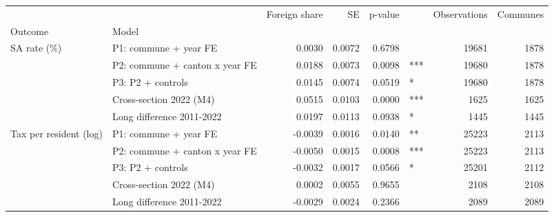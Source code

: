 \begin{tabular}{llrrrlrr}
\toprule
 &  & Foreign share & SE & p-value &  & Observations & Communes \\
Outcome & Model &  &  &  &  &  &  \\
\midrule
\multirow[t]{5}{*}{SA rate (\%)} & P1: commune + year FE & 0.0030 & 0.0072 & 0.6798 &  & 19681 & 1878 \\
 & P2: commune + canton x year FE & 0.0188 & 0.0073 & 0.0098 & *** & 19680 & 1878 \\
 & P3: P2 + controls & 0.0145 & 0.0074 & 0.0519 & * & 19680 & 1878 \\
 & Cross-section 2022 (M4) & 0.0515 & 0.0103 & 0.0000 & *** & 1625 & 1625 \\
 & Long difference 2011-2022 & 0.0197 & 0.0113 & 0.0938 & * & 1445 & 1445 \\
\cline{1-8}
\multirow[t]{5}{*}{Tax per resident (log)} & P1: commune + year FE & -0.0039 & 0.0016 & 0.0140 & ** & 25223 & 2113 \\
 & P2: commune + canton x year FE & -0.0050 & 0.0015 & 0.0008 & *** & 25223 & 2113 \\
 & P3: P2 + controls & -0.0032 & 0.0017 & 0.0566 & * & 25201 & 2112 \\
 & Cross-section 2022 (M4) & 0.0002 & 0.0055 & 0.9655 &  & 2108 & 2108 \\
 & Long difference 2011-2022 & -0.0029 & 0.0024 & 0.2366 &  & 2089 & 2089 \\
\cline{1-8}
\bottomrule
\end{tabular}
